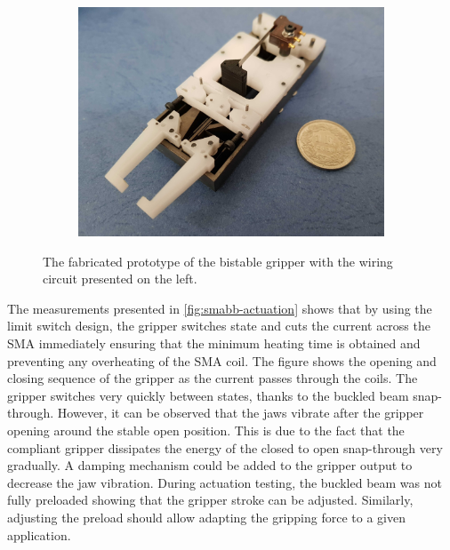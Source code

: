 \begin{figure}[hbt!]
\begin{subfigure}[b]{0.27\textwidth}
  \end{subfigure}
  \begin{subfigure}[b]{0.72\textwidth}
      \includegraphics[width=\textwidth]{images/chap7/smabb-proto-iso.jpg}
  \end{subfigure}
  \caption{The fabricated prototype of the bistable gripper with the wiring circuit presented on the left.}
  \label{fig:final-prototype}
\end{figure}

The measurements presented in \cref{fig:smabb-actuation} shows that by using the limit switch design, the gripper switches state and cuts the current across the SMA immediately ensuring that the minimum heating time is obtained and preventing any overheating of the SMA coil. The figure shows the opening and closing sequence of the gripper as the current passes through the coils. The gripper switches very quickly between states, thanks to the buckled beam snap-through. However, it can be observed that the jaws vibrate after the gripper opening around the stable open position. This is due to the fact that the compliant gripper dissipates the energy of the closed to open snap-through very gradually. A damping mechanism could be added to the gripper output to decrease the jaw vibration. During actuation testing, the buckled beam was not fully preloaded showing that the gripper stroke can be adjusted. Similarly, adjusting the preload should allow adapting the gripping force to a given application.

